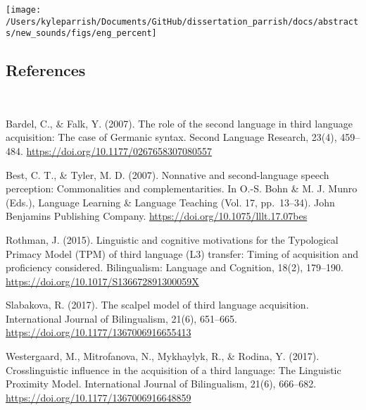 \documentclass[
  12pt,
]{article}
\begin{document}
\texttt{[image: /Users/kyleparrish/Documents/GitHub/dissertation\_parrish/docs/abstracts/new\_sounds/figs/eng\_percent]}

\hypertarget{references}{%
\subsection{References}\label{references}}

\begingroup
\setlength{\parindent}{-0.5in}
\setlength{\leftskip}{0.5in}
\phantom{.}

\textcolor{white}{\\} \vspace{-0.5in}

Bardel, C., \& Falk, Y. (2007). The role of the second language in third
language acquisition: The case of Germanic syntax. Second Language
Research, 23(4), 459--484.
\url{https://doi.org/10.1177/0267658307080557}

Best, C. T., \& Tyler, M. D. (2007). Nonnative and second-language
speech perception: Commonalities and complementarities. In O.-S. Bohn \&
M. J. Munro (Eds.), Language Learning \& Language Teaching (Vol. 17,
pp.~13--34). John Benjamins Publishing Company.
\url{https://doi.org/10.1075/lllt.17.07bes}

Rothman, J. (2015). Linguistic and cognitive motivations for the
Typological Primacy Model (TPM) of third language (L3) transfer: Timing
of acquisition and proficiency considered. Bilingualism: Language and
Cognition, 18(2), 179--190.
\url{https://doi.org/10.1017/S136672891300059X}

Slabakova, R. (2017). The scalpel model of third language acquisition.
International Journal of Bilingualism, 21(6), 651--665.
\url{https://doi.org/10.1177/1367006916655413}

Westergaard, M., Mitrofanova, N., Mykhaylyk, R., \& Rodina, Y. (2017).
Crosslinguistic influence in the acquisition of a third language: The
Linguistic Proximity Model. International Journal of Bilingualism,
21(6), 666--682. \url{https://doi.org/10.1177/1367006916648859}

\endgroup
\end{document}
